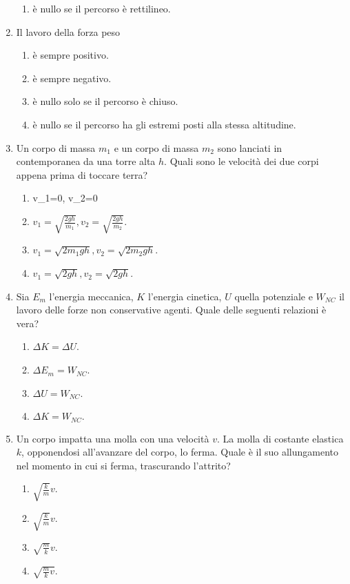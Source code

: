 \documentclass{article}
\begin{document}
\begin{enumerate}
\begin{enumerate}[label=\Alph*.]
    \item è nullo se il percorso è rettilineo.
  \end{enumerate}
  \item Il lavoro della forza peso
  \begin{enumerate}[label=\Alph*.]
    \item è sempre positivo.
    \item è sempre negativo.
    \item è nullo solo se il percorso è chiuso.
    \item è nullo se il percorso ha gli estremi posti alla stessa altitudine.
  \end{enumerate}
  \item Un corpo di massa $m_1$ e un corpo di massa $m_2$ sono lanciati in contemporanea da una torre alta $h$. Quali sono le velocità dei due corpi appena prima di toccare terra?
  \begin{enumerate}[label=\Alph*.]
    \item v_1=0, v_2=0
    \item $v_1=\sqrt{\frac{2gh}{m_1}}, v_2=\sqrt{\frac{2gh}{m_2}}$.
    \item $v_1=\sqrt{2m_1gh}, v_2=\sqrt{2m_2gh}$.
    \item $v_1=\sqrt{2gh}, v_2=\sqrt{2gh}$.
  \end{enumerate}
  \item Sia $E_m$ l'energia meccanica, $K$ l'energia cinetica, $U$ quella potenziale e $W_{NC}$ il lavoro delle forze non conservative agenti. Quale delle seguenti relazioni è vera?
  \begin{enumerate}[label=\Alph*.]
    \item $\Delta K = \Delta U$.
    \item $\Delta E_m=W_{NC}$.
    \item $\Delta U=W_{NC}$.
    \item $\Delta K=W_{NC}.$
  \end{enumerate}
  \item Un corpo impatta una molla con una velocità $v$. La molla di costante elastica $k$, opponendosi all'avanzare del corpo, lo ferma. Quale è il suo allungamento nel momento in cui si ferma, trascurando l'attrito?
  \begin{enumerate}[label=\Alph*.]
    \item $\sqrt{\frac{k}{m}}v$.
    \item $\sqrt{\frac{k}{m}}v$.
    \item $\sqrt{\frac{m}{k}}v$.
    \item $\sqrt{\frac{m}{k}v}$.

\end{enumerate}
\end{enumerate}
\end{document}
